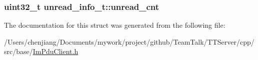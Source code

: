 \subsubsection[{unread\+\_\+cnt}]{\setlength{\rightskip}{0pt plus 5cm}uint32\+\_\+t unread\+\_\+info\+\_\+t\+::unread\+\_\+cnt}\label{structunread__info__t_a9b901d7900e52b4287adcc7ae5029c56}


The documentation for this struct was generated from the following file\+:\begin{DoxyCompactItemize}
\item 
/\+Users/chenjiang/\+Documents/mywork/project/github/\+Team\+Talk/\+T\+T\+Server/cpp/src/base/\hyperlink{_im_pdu_client_8h}{Im\+Pdu\+Client.\+h}\end{DoxyCompactItemize}
